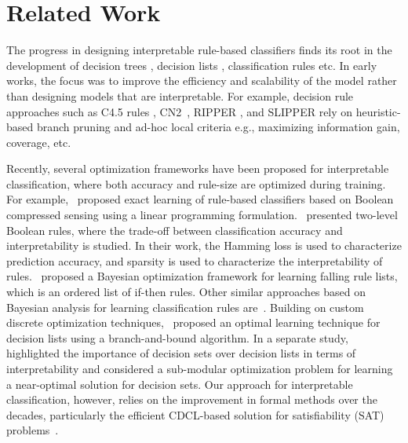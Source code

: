 \section{Related Work}
\label{interpretability_imli_sec:related}

The progress in designing interpretable rule-based classifiers finds its root in the development of decision trees \cite{bessiere2009minimising,quinlan1986induction,quinlan1987simplifying}, decision lists \cite{rivest1987learning}, classification rules \cite{cohen1995fast} etc.  In early works, the focus was to improve the efficiency and scalability of the model rather than designing models that are interpretable. For example,  decision rule approaches such as  C4.5 rules \cite{quinlan2014}, CN2~\cite{ClarkN1989}, RIPPER \cite{cohen1995fast}, and SLIPPER  \cite{CohenS1999} 
rely on heuristic-based branch pruning and ad-hoc local criteria e.g., maximizing information gain, coverage, etc.

Recently, several optimization frameworks have been proposed for interpretable classification, where both accuracy and rule-size are optimized during training. For example,~\cite{malioutov2013exact} proposed exact learning of rule-based classifiers based on Boolean compressed sensing using a linear programming formulation.~\cite{su2016learning} presented two-level Boolean rules, where the trade-off between classification accuracy and interpretability is studied. In their work, the Hamming loss is used to characterize prediction accuracy, and sparsity is used to characterize the interpretability of rules.~\cite{wang2015falling} proposed a Bayesian optimization framework for learning falling rule lists, which is an ordered list of if-then rules. Other similar approaches based on Bayesian analysis for learning classification rules are~\cite{letham2015interpretable,wang2017bayesian}. Building on custom discrete optimization techniques,~\cite{angelino2017learning} proposed an optimal learning technique for decision lists using a branch-and-bound algorithm. In a separate study,~\cite{lakkaraju2016interpretable} highlighted the importance of decision sets over decision lists in terms of interpretability and considered a sub-modular optimization problem for learning a near-optimal solution for decision sets. Our approach for interpretable classification, however, relies on the improvement in formal methods over the decades, particularly the efficient CDCL-based solution for satisfiability (SAT) problems~\cite{silva2003grasp}. 



